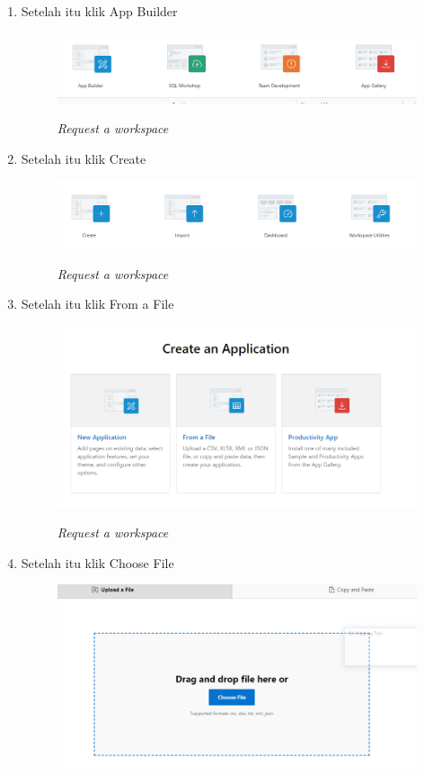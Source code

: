 \begin{enumerate}
\begin{figure}[!htbp]
\end{figure}
\item Setelah itu klik App Builder
\begin{figure}[!htbp]
    \centering
    \includegraphics[scale=0.5]{figure/10.PNG}
    \label{gambar 7}
     \caption{\textit{Request a workspace}}
\end{figure}
\item Setelah itu klik Create
\begin{figure}[!htbp]
    \centering
    \includegraphics[scale=0.5]{figure/11.PNG}
    \label{gambar 7}
     \caption{\textit{Request a workspace}}
\end{figure}
\item Setelah itu klik From a File
\begin{figure}[!htbp]
    \centering
    \includegraphics[scale=0.5]{figure/12.PNG}
    \label{gambar 7}
     \caption{\textit{Request a workspace}}
\end{figure} \vspace{6cm}
\item Setelah itu klik Choose File
\begin{figure}[!htbp]
    \centering
    \includegraphics[scale=0.5]{figure/13.PNG}

\end{figure}
\end{enumerate}
